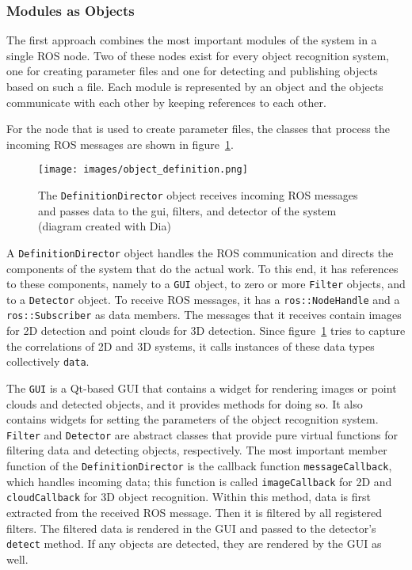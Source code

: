 \documentclass{article}
\newcommand{\code}[1]{\texttt{#1}}
\begin{document}
\subsubsection{Modules as Objects}
\label{sec:modules_as_obj}
The first approach combines the most important modules of the system
in a single ROS node.
Two of these nodes exist for every object recognition system, one for creating
parameter files and one for detecting and publishing objects
based on such a file.
Each module is represented by an object and the objects communicate with each
other by keeping references to each other.

For the node that is used to create parameter files, the classes that process
the incoming ROS messages are shown in figure~\ref{fig:classes_obj_def}.
\begin{figure}
	\centering
	\texttt{[image: images/object\_definition.png]}
	\caption{The \code{DefinitionDirector} object receives incoming ROS messages
	and passes data to the gui, filters, and detector of the system
	(diagram created with Dia)}
	\label{fig:classes_obj_def}
\end{figure}
A \code{DefinitionDirector} object handles the ROS communication and directs
the components of the system that do the actual work.
To this end, it has references to these components,
namely to a \code{GUI} object, to zero or more \code{Filter} objects,
and to a \code{Detector} object.
To receive ROS messages, it has a \code{ros::NodeHandle} and a \code{ros::Subscriber} as data members.
The messages that it receives contain images for 2D detection and point clouds for 3D detection.
Since figure~\ref{fig:classes_obj_def} tries to capture the correlations of
2D and 3D systems, it calls instances of these data types collectively \code{data}.

The \code{GUI} is a Qt-based GUI that contains a widget
for rendering images or point clouds and detected objects, and it provides methods for doing so.
It also contains widgets for setting the parameters of the object recognition system.
\code{Filter} and \code{Detector} are abstract classes that provide pure virtual functions for
filtering data and detecting objects, respectively.
The most important member function of the \code{DefinitionDirector} is the callback function
\code{messageCallback}, which handles incoming data;
this function is called \code{imageCallback} for 2D and \code{cloudCallback} for 3D
object recognition.
Within this method, data is first extracted from the received ROS message.
Then it is filtered by all registered filters.
The filtered data is rendered in the GUI and passed to the detector's \code{detect} method.
If any objects are detected, they are rendered by the GUI as well.
\end{document}
